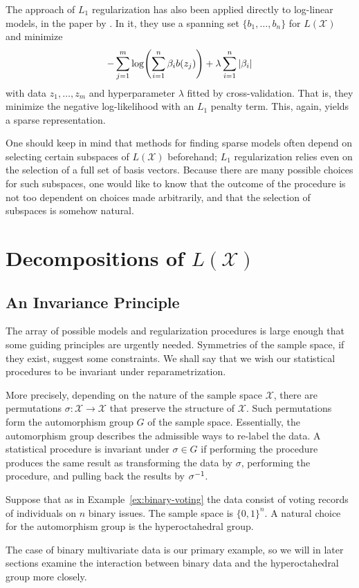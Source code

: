 \documentclass[cclicense]{hmcthesis}
\providecommand*{\xs}{\mathcal X}
\numberwithin{equation}{chapter}
\numberwithin{thmcounter}{chapter}
\begin{document}
    The approach of $L_1$ regularization has also been applied directly to
    log-linear models, in the paper by \citet{SPEC}.  In it, they use a spanning
    set
    $\{b_1, \ldots, b_n\}$ for $L(\xs)$ and minimize
    \[
        - \sum_{j=1}^m \log \pdel*{\sum_{i=1}^n \beta_i b(z_j)} + \lambda
        \sum_{i=1}^n |\beta_i| 
    \]
    with data $z_1, \ldots, z_m$ and hyperparameter $\lambda$ fitted by
    cross-validation.  That is, they minimize the negative log-likelihood with
    an $L_1$ penalty term.  This, again, yields a sparse representation.

    One should keep in mind that methods for finding sparse models often depend
    on selecting certain subspaces of $L(\xs)$ beforehand; $L_1$ regularization
    relies even on the selection of a full set of basis vectors.  Because there
    are many possible choices for such subspaces, one would like to know that
    the outcome of the procedure is not too dependent on choices made
    arbitrarily, and that the selection of subspaces is somehow natural.


\chapter{Decompositions of $L(\xs)$}

\section{An Invariance Principle}
    
    The array of possible models and regularization procedures is large enough
    that some guiding principles are urgently needed.  Symmetries of the sample
    space, if they exist, suggest some constraints.  We shall say that we wish
    our statistical procedures to be invariant under reparametrization.  

    More precisely, depending on the nature of the sample space $\xs$, there are
    permutations $\sigma: \xs \to \xs$ that preserve the structure of $\xs$.
    Such permutations form the automorphism group $G$ of the sample space.
    Essentially, the automorphism group describes the admissible ways to re-label
    the data.  A statistical procedure is invariant under $\sigma \in G$ if
    performing the procedure produces the same result as transforming the data
    by $\sigma$, performing the procedure, and pulling back the results by
    $\sigma^{-1}$.

    \begin{example}
        Suppose that as in Example~\ref{ex:binary-voting} the data consist of
        voting records of individuals on $n$ binary issues.  The sample space is
        $\{0, 1\}^n$.  A natural choice for the automorphism group is the
        hyperoctahedral group.  
        
        The case of binary multivariate data is our primary example, so we will
        in later sections examine the interaction between binary data and the
        hyperoctahedral group more closely.
    \end{example}
    
\end{document}
